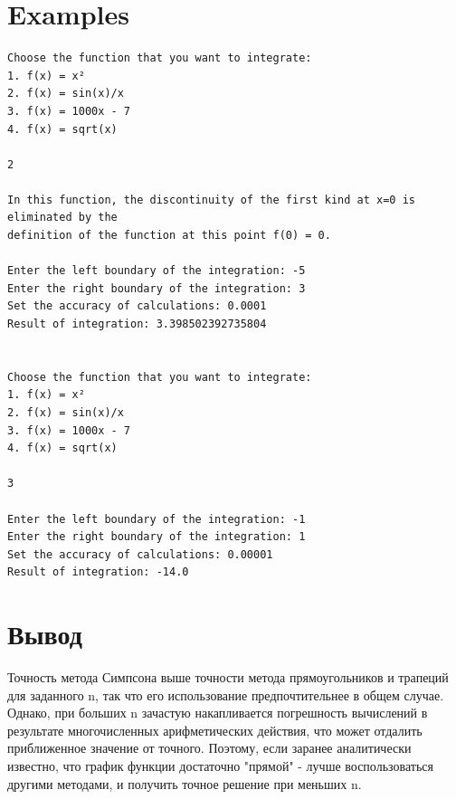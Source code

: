 \section{Examples}
\begin{verbatim}
Choose the function that you want to integrate:
1. f(x) = x²
2. f(x) = sin(x)/x
3. f(x) = 1000x - 7
4. f(x) = sqrt(x)

2

In this function, the discontinuity of the first kind at x=0 is eliminated by the
definition of the function at this point f(0) = 0.

Enter the left boundary of the integration: -5
Enter the right boundary of the integration: 3
Set the accuracy of calculations: 0.0001
Result of integration: 3.398502392735804


Choose the function that you want to integrate:
1. f(x) = x²
2. f(x) = sin(x)/x
3. f(x) = 1000x - 7
4. f(x) = sqrt(x)

3

Enter the left boundary of the integration: -1
Enter the right boundary of the integration: 1
Set the accuracy of calculations: 0.00001
Result of integration: -14.0

\end{verbatim}


\section{Вывод}
Точность метода Симпсона выше точности метода прямоугольников и трапеций для заданного n, так
что его использование предпочтительнее в общем случае. Однако, при больших n зачастую накапливается
погрешность вычислений в результате многочисленных арифметических действия, что может отдалить приближенное значение от точного.
Поэтому, если заранее аналитически известно, что график функции достаточно "прямой" - лучше воспользоваться
другими методами, и получить точное решение при меньших n.
